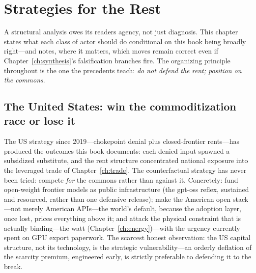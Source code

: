 \chapter{Strategies for the Rest}
\label{ch:strategies}

A structural analysis owes its readers agency, not just diagnosis. This chapter states what each class of actor should do conditional on this book being broadly right---and notes, where it matters, which moves remain correct even if Chapter~\ref{ch:synthesis}'s falsification branches fire. The organizing principle throughout is the one the precedents teach: \emph{do not defend the rent; position on the commons}.

\section{The United States: win the commoditization race or lose it}

The US strategy since 2019---chokepoint denial plus closed-frontier rents---has produced the outcomes this book documents: each denied input spawned a subsidized substitute, and the rent structure concentrated national exposure into the leveraged trade of Chapter~\ref{ch:trade}. The counterfactual strategy has never been tried: compete \emph{for} the commons rather than against it. Concretely: fund open-weight frontier models as public infrastructure (the gpt-oss reflex, sustained and resourced, rather than one defensive release); make the American open stack---not merely American APIs---the world's default, because the adoption layer, once lost, prices everything above it; and attack the physical constraint that is actually binding---the watt (Chapter~\ref{ch:energy})---with the urgency currently spent on GPU export paperwork. The scarcest honest observation: the US capital structure, not its technology, is the strategic vulnerability---an orderly deflation of the scarcity premium, engineered early, is strictly preferable to defending it to the break.

